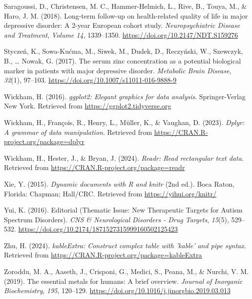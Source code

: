 \documentclass[
  man,floatsintext]{apa6}
\newlength{\cslhangindent}
\newlength{\cslentryspacingunit} %
\newenvironment{CSLReferences}[2] %
 {%
  \setlength{\parindent}{0pt}
  \ifodd #1
  \let\oldpar\par
  \def\par{\hangindent=\cslhangindent\oldpar}
  \fi
  \setlength{\parskip}{#2\cslentryspacingunit}
 }%
 {}
\begin{document}
\begin{CSLReferences}{1}{0}
\leavevmode{}%
Saragoussi, D., Christensen, M. C., Hammer-Helmich, L., Rive, B., Touya, M., \& Haro, J. M. (2018). Long-term follow-up on health-related quality of life in major depressive disorder: A 2-year {European} cohort study. \emph{Neuropsychiatric Disease and Treatment}, \emph{Volume 14}, 1339--1350. \url{https://doi.org/10.2147/NDT.S159276}

\leavevmode{}%
Styczeń, K., Sowa-Kućma, M., Siwek, M., Dudek, D., Reczyński, W., Szewczyk, B., \ldots{} Nowak, G. (2017). The serum zinc concentration as a potential biological marker in patients with major depressive disorder. \emph{Metabolic Brain Disease}, \emph{32}(1), 97--103. \url{https://doi.org/10.1007/s11011-016-9888-9}

\leavevmode{}%
Wickham, H. (2016). \emph{ggplot2: Elegant graphics for data analysis}. Springer-Verlag New York. Retrieved from \url{https://ggplot2.tidyverse.org}

\leavevmode{}%
Wickham, H., François, R., Henry, L., Müller, K., \& Vaughan, D. (2023). \emph{Dplyr: A grammar of data manipulation}. Retrieved from \url{https://CRAN.R-project.org/package=dplyr}

\leavevmode{}%
Wickham, H., Hester, J., \& Bryan, J. (2024). \emph{Readr: Read rectangular text data}. Retrieved from \url{https://CRAN.R-project.org/package=readr}

\leavevmode{}%
Xie, Y. (2015). \emph{Dynamic documents with {R} and knitr} (2nd ed.). Boca Raton, Florida: Chapman; Hall/CRC. Retrieved from \url{https://yihui.org/knitr/}

\leavevmode{}%
Yui, K. (2016). Editorial ({Thematic Issue}: {New Therapeutic Targets} for {Autism Spectrum Disorders}). \emph{CNS \& Neurological Disorders - Drug Targets}, \emph{15}(5), 529--532. \url{https://doi.org/10.2174/1871527315999160502125423}

\leavevmode{}%
Zhu, H. (2024). \emph{kableExtra: Construct complex table with 'kable' and pipe syntax}. Retrieved from \url{https://CRAN.R-project.org/package=kableExtra}

\leavevmode{}%
Zoroddu, M. A., Aaseth, J., Crisponi, G., Medici, S., Peana, M., \& Nurchi, V. M. (2019). The essential metals for humans: A brief overview. \emph{Journal of Inorganic Biochemistry}, \emph{195}, 120--129. \url{https://doi.org/10.1016/j.jinorgbio.2019.03.013}

\end{CSLReferences}
\end{document}
